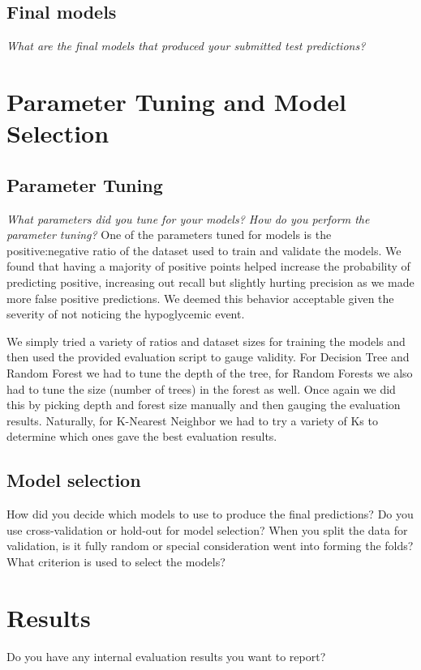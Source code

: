 \documentclass[11pt,a4paper]{article}
\begin{document}
\subsection{Final models}
\textit{What are the final models that produced your submitted test predictions?}


\section{Parameter Tuning and Model Selection }

\subsection{Parameter Tuning}
\textit{What parameters did you tune for your models? How do you perform the parameter tuning?}
One of the parameters tuned for models is the positive:negative ratio of the dataset used to train and validate the models. We found that having a majority of positive points helped increase the probability of predicting positive, increasing out recall but slightly hurting precision as we made more false positive predictions. We deemed this behavior acceptable given the severity of not noticing the hypoglycemic event.

We simply tried a variety of ratios and dataset sizes for training the models and then used the provided evaluation script to gauge validity. For Decision Tree and Random Forest we had to tune the depth of the tree, for Random Forests we also had to tune the size (number of trees) in the forest as well. Once again we did this by picking depth and forest size manually and then gauging the evaluation results. Naturally, for K-Nearest Neighbor we had to try a variety of Ks to determine which ones gave the best evaluation results. 



\subsection{Model selection}
How did you decide which models to use to produce the final predictions?  Do you use cross-validation or hold-out for model selection? When you split the data for validation, is it fully random or special consideration went into forming the folds? What criterion is used to select the models?


\section{Results}
Do you have any internal evaluation results you want to report?
\end{document}
